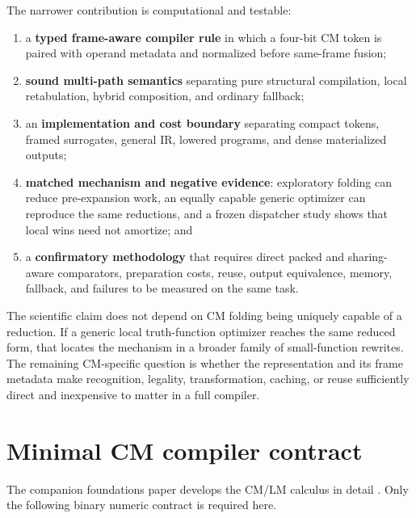 \documentclass[10pt]{article}
\theoremstyle{plain}
\theoremstyle{definition}
\theoremstyle{remark}
\begin{document}
The narrower contribution is computational and testable:
\begin{enumerate}
  \item a \textbf{typed frame-aware compiler rule} in which a four-bit CM token is paired with operand metadata and normalized before same-frame fusion;
  \item \textbf{sound multi-path semantics} separating pure structural compilation, local retabulation, hybrid composition, and ordinary fallback;
  \item an \textbf{implementation and cost boundary} separating compact tokens, framed surrogates, general IR, lowered programs, and dense materialized outputs;
  \item \textbf{matched mechanism and negative evidence}: exploratory folding can reduce pre-expansion work, an equally capable generic optimizer can reproduce the same reductions, and a frozen dispatcher study shows that local wins need not amortize; and
  \item a \textbf{confirmatory methodology} that requires direct packed and sharing-aware comparators, preparation costs, reuse, output equivalence, memory, fallback, and failures to be measured on the same task.
\end{enumerate}

The scientific claim does not depend on CM folding being uniquely capable of a reduction. If a generic local truth-function optimizer reaches the same reduced form, that locates the mechanism in a broader family of small-function rewrites. The remaining CM-specific question is whether the representation and its frame metadata make recognition, legality, transformation, caching, or reuse sufficiently direct and inexpensive to matter in a full compiler.

\section{Minimal CM compiler contract}
\label{sec:minimal-contract}

The companion foundations paper develops the CM/LM calculus in detail \cite{TheoryFoundations2026}. Only the following binary numeric contract is required here.
\end{document}
